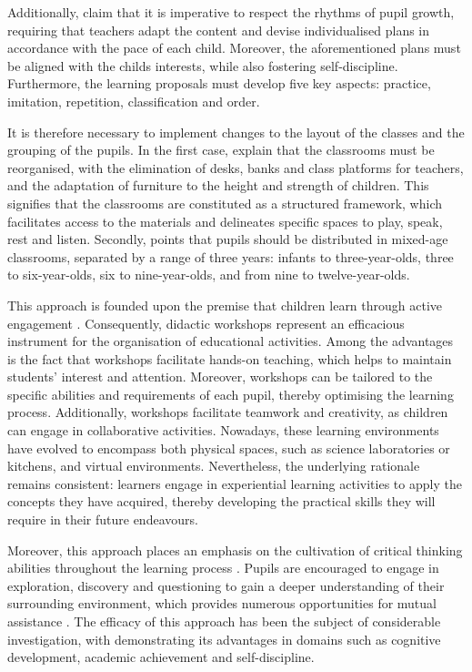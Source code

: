 Additionally, \textcite{pla2007} claim that it is imperative
to respect the rhythms of pupil growth, requiring that teachers adapt
the content and devise individualised plans in accordance with the pace
of each child. Moreover, the aforementioned plans must be aligned with
the child\textquotesingle s interests, while also fostering
self-discipline. Furthermore, the learning proposals must develop five
key aspects: practice, imitation, repetition, classification and order.

It is therefore necessary to implement changes to the layout of the
classes and the grouping of the pupils. In the first case, \textcite{pla2007} explain that the classrooms must be reorganised, with the
elimination of desks, banks and class platforms for teachers, and the
adaptation of furniture to the height and strength of children. This
signifies that the classrooms are constituted as a structured framework,
which facilitates access to the materials and delineates specific spaces
to play, speak, rest and listen. Secondly, \cite{lillard2013playful} points that
pupils should be distributed in mixed-age classrooms, separated by a
range of three years: infants to three-year-olds, three to
six-year-olds, six to nine-year-olds, and from nine to twelve-year-olds.

This approach is founded upon the premise that children learn through
active engagement \cite{pla2007}. Consequently, didactic
workshops represent an efficacious instrument for the organisation of
educational activities. Among the advantages is the fact that workshops
facilitate hands-on teaching, which helps to maintain
students' interest and attention. Moreover, workshops
can be tailored to the specific abilities and requirements of each
pupil, thereby optimising the learning process. Additionally, workshops
facilitate teamwork and creativity, as children can engage in
collaborative activities. Nowadays, these learning environments have
evolved to encompass both physical spaces, such as science laboratories
or kitchens, and virtual environments. Nevertheless, the underlying
rationale remains consistent: learners engage in experiential learning
activities to apply the concepts they have acquired, thereby developing
the practical skills they will require in their future endeavours.

Moreover, this approach places an emphasis on the cultivation of
critical thinking abilities throughout the learning process \cite{murray2011montessori}. Pupils are encouraged to engage in exploration, discovery and
questioning to gain a deeper understanding of their surrounding
environment, which provides numerous opportunities for mutual assistance
\cite{pla2007}. The efficacy of this approach has been the
subject of considerable investigation, with \cite{lillard2013playful} demonstrating
its advantages in domains such as cognitive development, academic
achievement and self-discipline.

